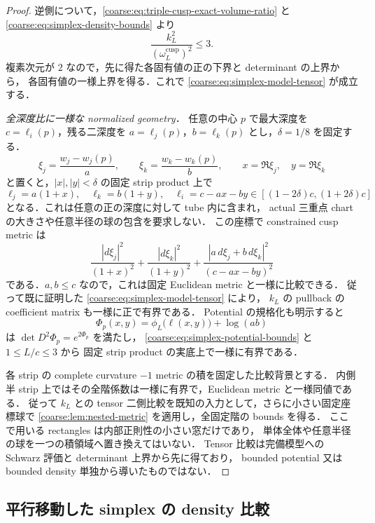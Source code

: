 \begin{proof}
逆側について，\eqref{coarse:eq:triple-cusp-exact-volume-ratio} と
\eqref{coarse:eq:simplex-density-bounds} より
\[
 \frac{k_L^2}{(\omega_L^{\mathrm{cusp}})^2}\le3.
\]
複素次元が $2$ なので，先に得た各固有値の正の下界と determinant の上界から，
各固有値の一様上界を得る．これで \eqref{coarse:eq:simplex-model-tensor} が成立する．

\emph{全深度比に一様な normalized geometry．}
任意の中心 $p$ で最大深度を $c=\ell_i(p)$，残る二深度を
$a=\ell_j(p)$，$b=\ell_k(p)$ とし，$\delta=1/8$ を固定する．
\[
 \xi_j=\frac{w_j-w_j(p)}a,\qquad
 \xi_k=\frac{w_k-w_k(p)}b,\qquad x=\Re\xi_j,\quad y=\Re\xi_k
\]
と置くと，$|x|,|y|<\delta$ の固定 strip product 上で
\[
 \ell_j=a(1+x),\quad\ell_k=b(1+y),\quad
 \ell_i=c-ax-by\in[(1-2\delta)c,(1+2\delta)c]
\]
となる．これは任意の正の深度に対して tube 内に含まれ，
actual 三重点 chart の大きさや任意半径の球の包含を要求しない．
この座標で constrained cusp metric は
\[
 \frac{|d\xi_j|^2}{(1+x)^2}
 +\frac{|d\xi_k|^2}{(1+y)^2}
 +\frac{|a\,d\xi_j+b\,d\xi_k|^2}{(c-ax-by)^2}
\]
である．$a,b\le c$ なので，これは固定 Euclidean metric と一様に比較できる．
従って既に証明した \eqref{coarse:eq:simplex-model-tensor} により，
$k_L$ の pullback の coefficient matrix も一様に正で有界である．
Potential の規格化も明示すると
\begin{equation}\label{coarse:eq:simplex-normalized-potential}
 \Phi_p(x,y)=\phi_L\bigl(\ell(x,y)\bigr)+\log(ab)
\end{equation}
は $\det D^2\Phi_p=e^{2\Phi_p}$ を満たし，
\eqref{coarse:eq:simplex-potential-bounds} と $1\le L/c\le3$ から
固定 strip product の実底上で一様に有界である．

各 strip の complete curvature $-1$ metric の積を固定した比較背景とする．
内側半 strip 上ではその全階係数は一様に有界で，Euclidean metric と一様同値である．
従って $k_L$ との tensor 二側比較を既知の入力として，さらに小さい固定座標球で
\cref{coarse:lem:nested-metric} を適用し，全固定階の bounds を得る．
ここで用いる rectangles は内部正則性の小さい窓だけであり，
単体全体や任意半径の球を一つの積領域へ置き換えてはいない．
Tensor 比較は完備模型への Schwarz 評価と determinant 上界から先に得ており，
bounded potential 又は bounded density 単独から導いたものではない．
\end{proof}

\subsection{平行移動した simplex の density 比較}

